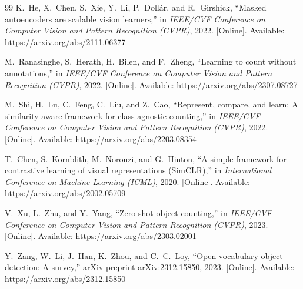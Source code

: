 \documentclass[a4paper,12pt]{report}
\numberwithin{figure}{chapter}
\numberwithin{table}{chapter}
\begin{document}
\begin{thebibliography}{99}
K.~He, X.~Chen, S.~Xie, Y.~Li, P.~Doll{\'a}r, and R.~Girshick,
``Masked autoencoders are scalable vision learners,''
in \emph{IEEE/CVF Conference on Computer Vision and Pattern
Recognition (CVPR)}, 2022.
[Online]. Available:
\url{https://arxiv.org/abs/2111.06377}

M.~Ranasinghe, S.~Herath, H.~Bilen, and F.~Zheng,
``Learning to count without annotations,''
in \emph{IEEE/CVF Conference on Computer Vision and Pattern
Recognition (CVPR)}, 2022.
[Online]. Available:
\url{https://arxiv.org/abs/2307.08727}

M.~Shi, H.~Lu, C.~Feng, C.~Liu, and Z.~Cao,
``Represent, compare, and learn: A similarity-aware framework
for class-agnostic counting,''
in \emph{IEEE/CVF Conference on Computer Vision and Pattern
Recognition (CVPR)}, 2022.
[Online]. Available:
\url{https://arxiv.org/abs/2203.08354}

T.~Chen, S.~Kornblith, M.~Norouzi, and G.~Hinton,
``A simple framework for contrastive learning of visual
representations (SimCLR),''
in \emph{International Conference on Machine Learning (ICML)}, 2020.
[Online]. Available:
\url{https://arxiv.org/abs/2002.05709}

V.~Xu, L.~Zhu, and Y.~Yang,
``Zero-shot object counting,''
in \emph{IEEE/CVF Conference on Computer Vision and Pattern
Recognition (CVPR)}, 2023.
[Online]. Available:
\url{https://arxiv.org/abs/2303.02001}

Y.~Zang, W.~Li, J.~Han, K.~Zhou, and C.~C.~Loy,
``Open-vocabulary object detection: A survey,''
arXiv preprint arXiv:2312.15850, 2023.
[Online]. Available:
\url{https://arxiv.org/abs/2312.15850}

\end{thebibliography}
\end{document}
